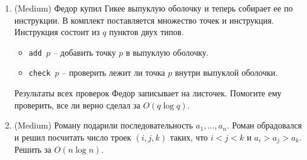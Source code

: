 \begin{enumerate}
  \item (Medium) Федор купил Гикее выпуклую оболочку и теперь собирает ее 
  по инструкции. В комплект поставляется множество точек и инструкция.
  Инструкция состоит из $q$ пунктов двух типов.
  \begin{itemize}
    \item \texttt{add $p$} -- добавить точку $p$ в выпуклую оболочку.
    \item \texttt{check $p$} -- проверить лежит ли точка $p$ внутри выпуклой оболочки.
  \end{itemize}
  Результаты всех проверок Федор записывает на листочек. Помогите ему
  проверить, все ли верно сделал за $O(q \log q)$.
  
  \item (Medium) Роману подарили последовательность $a_1, \dots, a_n$.
  Роман обрадовался и решил посчитать число троек $(i, j, k)$
  таких, что $i < j < k$ и $a_i > a_j > a_k$. Решить за $O(n \log n)$.

\end{enumerate}
